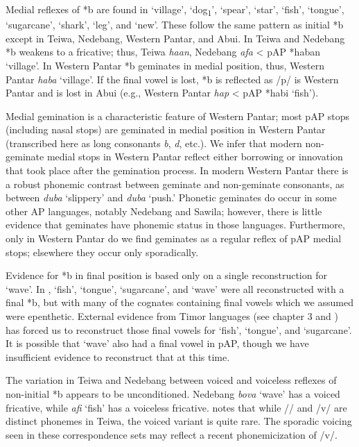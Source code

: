 Medial reflexes of *b are found in `village', `dog\textsubscript{1}', `spear', `star', `fish', `tongue', `sugarcane', `shark', `leg', and `new'. These follow the same pattern as initial *b except in Teiwa, Nedebang, Western Pantar, and Abui. In Teiwa and Nedebang *b weakens to a fricative; thus, Teiwa \textit{ha{\textphi}an}, Nedebang \textit{afa{\ng}} {\textless} pAP *haban `village'. In Western Pantar *b geminates in medial position, thus, Western Pantar \textit{hab{\textlengthmark}a{\ng}} `village'. If the final vowel is lost, *b is reflected as /p/ is Western Pantar and is lost in Abui (e.g., Western Pantar \textit{hap} {\textless} pAP *habi `fish'). 

Medial gemination is a characteristic feature of Western Pantar; most pAP stops (including nasal stops) are geminated in medial position in Western Pantar (transcribed here as long consonants\textit{ b{\textlengthmark}},\textit{ d{\textlengthmark}}, etc.). We infer that modern non-geminate medial stops in Western Pantar reflect either borrowing or innovation that took place after the gemination process. In modern Western Pantar there is a robust phonemic contrast between geminate and non-geminate consonants, as between \textit{duba }`slippery' and \textit{dub{\textlengthmark}a }`push.' Phonetic geminates do occur in some other AP languages, notably Nedebang and Sawila; however, there is little evidence that geminates have phonemic status in those languages. Furthermore, only in Western Pantar do we find geminates as a regular reflex of pAP medial stops; elsewhere they occur only sporadically. 

Evidence for *b in final position is based only on a single reconstruction for `wave'. In \citet{HoltonEtAl2012}, `fish', `tongue', `sugarcane', and `wave' were all reconstructed with a final *b, but with many of the cognates containing final vowels which we assumed were epenthetic. External evidence from Timor languages (see chapter 3 and \citealt{SchapperEtAl2012}) has forced us to reconstruct those final vowels for `fish', `tongue', and `sugarcane'. It is possible that `wave' also had a final vowel in pAP, though we have insufficient evidence to reconstruct that at this time.

The variation in Teiwa and Nedebang between voiced and voiceless reflexes of non-initial *b appears to be unconditioned. Nedebang \textit{bova }`wave' has a voiced fricative, while \textit{a{\textlengthmark}fi} `fish' has a voiceless fricative. \citet[38]{Klamer2010} notes that while /{\textphi}/ and /v/ are distinct phonemes in Teiwa, the voiced variant is quite rare. The sporadic voicing seen in these correspondence sets may reflect a recent phonemicization of /v/. 

